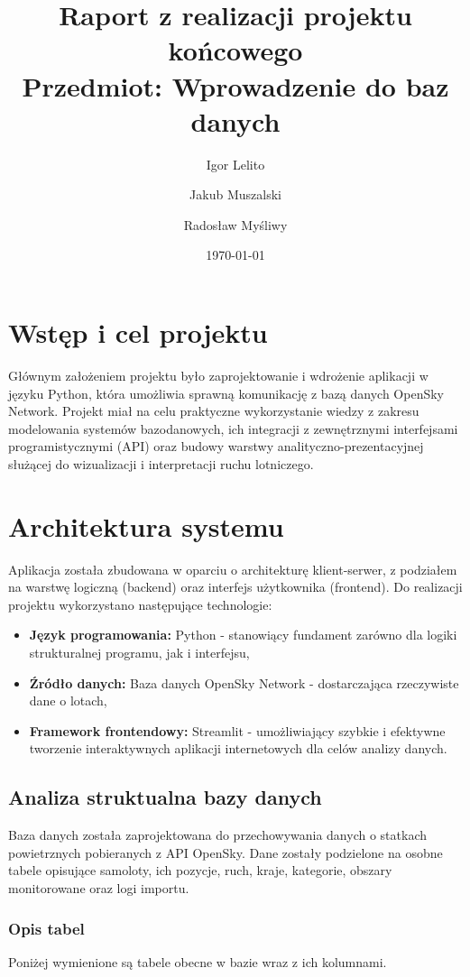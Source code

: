 \documentclass[12pt,a4paper]{article}
\title{Raport z realizacji projektu końcowego \\ \large Przedmiot: Wprowadzenie do baz danych}
\author{Igor Lelito \and Jakub Muszalski \and Radosław Myśliwy}
\date{\today}
\begin{document}
\maketitle

\section{Wstęp i cel projektu}
Głównym założeniem projektu było zaprojektowanie i wdrożenie aplikacji
w języku Python, która umożliwia sprawną komunikację z bazą danych 
OpenSky Network. Projekt miał na celu praktyczne wykorzystanie wiedzy 
z zakresu modelowania systemów bazodanowych, ich integracji z 
zewnętrznymi interfejsami programistycznymi (API) oraz budowy warstwy 
analityczno-prezentacyjnej służącej do wizualizacji i interpretacji 
ruchu lotniczego.

\section{Architektura systemu}
Aplikacja została zbudowana w oparciu o architekturę klient-serwer,
z podziałem na warstwę logiczną (backend) oraz interfejs użytkownika (frontend). Do realizacji projektu wykorzystano
następujące technologie:
\begin{itemize}[label=$\bullet$]
    \item \textbf{Język programowania:} Python - stanowiący fundament zarówno dla logiki strukturalnej programu, jak i interfejsu,
    \item \textbf{Źródło danych:} Baza danych OpenSky Network - dostarczająca rzeczywiste dane o lotach,
    \item \textbf{Framework frontendowy:} Streamlit - umożliwiający szybkie i efektywne tworzenie interaktywnych aplikacji internetowych dla celów analizy danych.
\end{itemize}

\subsection{Analiza struktualna bazy danych}

Baza danych została zaprojektowana do przechowywania danych o statkach powietrznych pobieranych z API OpenSky. Dane zostały podzielone na osobne tabele opisujące samoloty, ich pozycje, ruch, kraje, kategorie, obszary monitorowane oraz logi importu.

\subsubsection{Opis tabel}
Poniżej wymienione są tabele obecne w bazie wraz z ich kolumnami.
\end{document}
